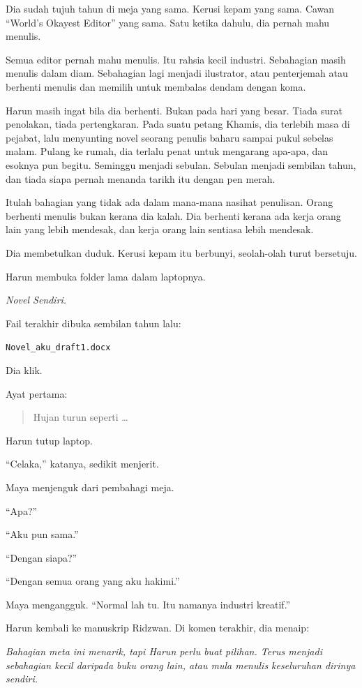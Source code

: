 \documentclass[
  11pt,
  a5paper,
  openany,
  oneside]{book}
\begin{document}
Dia sudah tujuh tahun di meja yang sama. Kerusi kepam yang sama. Cawan
``World's Okayest Editor'' yang sama. Satu ketika dahulu, dia pernah
mahu menulis.

Semua editor pernah mahu menulis. Itu rahsia kecil industri. Sebahagian
masih menulis dalam diam. Sebahagian lagi menjadi ilustrator, atau
penterjemah atau berhenti menulis dan memilih untuk membalas dendam
dengan koma.

Harun masih ingat bila dia berhenti. Bukan pada hari yang besar. Tiada
surat penolakan, tiada pertengkaran. Pada suatu petang Khamis, dia
terlebih masa di pejabat, lalu menyunting novel seorang penulis baharu
sampai pukul sebelas malam. Pulang ke rumah, dia terlalu penat untuk
mengarang apa-apa, dan esoknya pun begitu. Seminggu menjadi sebulan.
Sebulan menjadi sembilan tahun, dan tiada siapa pernah menanda tarikh
itu dengan pen merah.

Itulah bahagian yang tidak ada dalam mana-mana nasihat penulisan. Orang
berhenti menulis bukan kerana dia kalah. Dia berhenti kerana ada kerja
orang lain yang lebih mendesak, dan kerja orang lain sentiasa lebih
mendesak.

Dia membetulkan duduk. Kerusi kepam itu berbunyi, seolah-olah turut
bersetuju.

Harun membuka folder lama dalam laptopnya.

\emph{Novel Sendiri.}

Fail terakhir dibuka sembilan tahun lalu:

\texttt{Novel\_aku\_draft1.docx}

Dia klik.

Ayat pertama:

\begin{quote}
Hujan turun seperti \ldots{}
\end{quote}

Harun tutup laptop.

``Celaka,'' katanya, sedikit menjerit.

Maya menjenguk dari pembahagi meja.

``Apa?''

``Aku pun sama.''

``Dengan siapa?''

``Dengan semua orang yang aku hakimi.''

Maya mengangguk. ``Normal lah tu. Itu namanya industri kreatif.''

Harun kembali ke manuskrip Ridzwan. Di komen terakhir, dia menaip:

\emph{Bahagian meta ini menarik, tapi Harun perlu buat pilihan. Terus
menjadi sebahagian kecil daripada buku orang lain, atau mula menulis
keseluruhan dirinya sendiri.}
\end{document}
